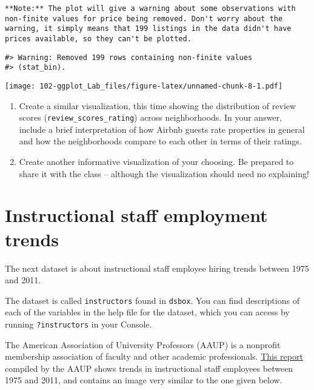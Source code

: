 \documentclass[
]{book}
\begin{document}
\begin{verbatim}
**Note:** The plot will give a warning about some observations with non-finite values for price being removed. Don't worry about the warning, it simply means that 199 listings in the data didn't have prices available, so they can't be plotted.
\end{verbatim}

\begin{verbatim}
#> Warning: Removed 199 rows containing non-finite values
#> (stat_bin).
\end{verbatim}

\texttt{[image: 102-ggplot\_Lab\_files/figure-latex/unnamed-chunk-8-1.pdf]}

\begin{enumerate}
\def\labelenumi{\arabic{enumi}.}
\setcounter{enumi}{5}
\item
  Create a similar visualization, this time showing the distribution of review scores (\texttt{review\_scores\_rating}) across neighborhoods. In your answer, include a brief interpretation of how Airbnb guests rate properties in general and how the neighborhoods compare to each other in terms of their ratings.
\item
  Create another informative visualization of your choosing. Be prepared to share it with the class -- although the visualization should need no explaining!
\end{enumerate}

\hypertarget{instructional-staff-employment-trends}{%
\section{Instructional staff employment trends}\label{instructional-staff-employment-trends}}

The next dataset is about instructional staff employee hiring trends between 1975 and 2011.

The dataset is called \texttt{instructors} found in \texttt{dsbox}. You can find descriptions of each of the variables in the help file for the dataset, which you can access by running \texttt{?instructors} in your Console.

The American Association of University Professors (AAUP) is a nonprofit membership association of faculty and other academic professionals. \href{https://www.aaup.org/sites/default/files/files/AAUP_Report_InstrStaff-75-11_apr2013.pdf}{This report} compiled by the AAUP shows trends in instructional staff employees between 1975 and 2011, and contains an image very similar to the one given below.
\end{document}
